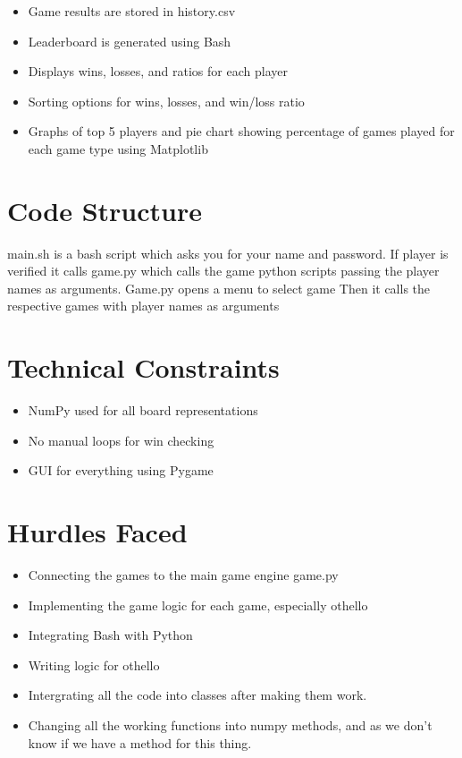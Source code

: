 \documentclass[12pt]{article} %
\begin{document}
\begin{itemize}
    \item Game results are stored in history.csv
    \item Leaderboard is generated using Bash
    \item Displays wins, losses, and ratios for each player
    \item Sorting options for wins, losses, and win/loss ratio  
    \item Graphs of top 5 players and pie chart showing percentage of games played for each game type using Matplotlib
\end{itemize}

\section{Code Structure}
main.sh is a bash script which asks you for your name and password.
If player is verified it calls game.py which calls the game python scripts passing the player names as arguments.
Game.py opens a menu to select game
Then it calls the respective games with player names as arguments

\section{Technical Constraints}

\begin{itemize}
    \item NumPy used for all board representations
    \item No manual loops for win checking
    \item GUI for everything using Pygame
\end{itemize}

\section{Hurdles Faced}

\begin{itemize}
    \item Connecting the games to the main game engine game.py
    \item Implementing the game logic for each game, especially othello
    \item Integrating Bash with Python
    \item Writing logic for othello
    \item Intergrating all the code into classes after making them work. 
    \item Changing all the working functions into numpy methods, and as we don't know if we have a method for this thing.
\end{itemize}
\end{document}
